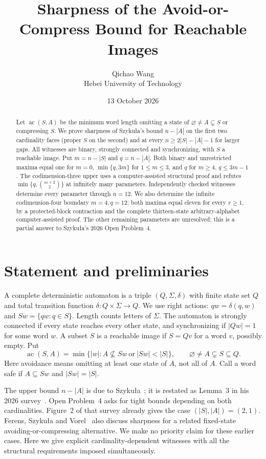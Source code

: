 \documentclass[10pt]{article}
\title{Sharpness of the Avoid-or-Compress Bound for Reachable Images}
\author{Qichao Wang\\Hebei University of Technology}
\date{13 October 2026}
\newcommand{\ac}{\operatorname{ac}}
\begin{document}
\maketitle
\begin{abstract}
Let $\ac(S,A)$ be the minimum word length omitting a state of $\varnothing\ne A\subsetneq S$ or compressing $S$. We prove sharpness of Szyku\l a's bound $n-|A|$ on the first two cardinality faces (proper $S$ on the second) and at every $n\ge2|S|-|A|-1$ for larger gaps. All witnesses are binary, strongly connected and synchronizing, with $S$ a reachable image. Put $m=n-|S|$ and $q=n-|A|$. Both binary and unrestricted maxima equal one for $m=0$, $\min\{q,3m\}$ for $1\le m\le3$, and $q$ for $m\ge4$, $q\le3m-1$. The codimension-three upper uses a computer-assisted structural proof and refutes $\min\{q,\binom{m+2}{2}\}$ at infinitely many parameters. Independently checked witnesses determine every parameter through $n=12$. We also determine the infinite codimension-four boundary $m=4,q=12$: both maxima equal eleven for every $r\ge1$, by a protected-block contraction and the complete thirteen-state arbitrary-alphabet computer-assisted proof. The other remaining parameters are unresolved; this is a partial answer to Szyku\l a's 2026 Open Problem~4.
\end{abstract}

\section{Statement and preliminaries}
A complete deterministic automaton is a triple $(Q,\Sigma,\delta)$ with finite state set $Q$ and total transition function $\delta:Q\times\Sigma\to Q$. We use right actions: $qw=\delta(q,w)$ and $Sw=\{qw:q\in S\}$. Length counts letters of $\Sigma$. The automaton is strongly connected if every state reaches every other state, and synchronizing if $|Qw|=1$ for some word $w$. A subset $S$ is a reachable image if $S=Qv$ for a word $v$, possibly empty. Put
\[
 \ac(S,A)=\min\{|w|: A\nsubseteq Sw\ \text{or}\ |Sw|<|S|\},
 \qquad \varnothing\ne A\subsetneq S\subseteq Q.
\]
Here avoidance means omitting at least one state of $A$, not all of $A$. Call a word safe if $A\subseteq Sw$ and $|Sw|=|S|$.

The upper bound $n-|A|$ is due to Szyku\l a~\cite[Lemma~2]{szykula2018}; it is restated as Lemma~3 in his 2026 survey~\cite{szykula2026}. Open Problem~4 asks for tight bounds depending on both cardinalities. Figure~2 of that survey already gives the case $(|S|,|A|)=(2,1)$. Ferens, Szyku\l a and Vorel~\cite[p.~46:6]{ferens2021} also discuss sharpness for a related fixed-state avoiding-or-compressing alternative. We make no priority claim for these earlier cases. Here we give explicit cardinality-dependent witnesses with all the structural requirements imposed simultaneously.
\end{document}

